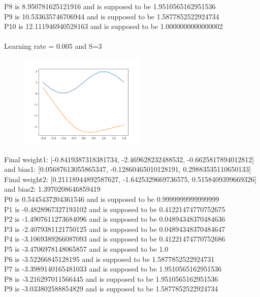 \documentclass{article}
\begin{document}
P8 is 8.950781625121916 and is supposed to be 1.9510565162951536\\
P9 is 10.533635746706944 and is supposed to be 1.5877852522924734\\
P10 is 12.111946940528163 and is supposed to be 1.0000000000000002\\~\\
Learning rate = 0.005 and S=3\\
\begin{figure}[htp]
    \centering
    \includegraphics[width=6cm]{photos/1_005.png}
    \label{fig:2}
\end{figure}
Final weight1: [-0.8419387318381734, -2.469628232488532, -0.6625817894012812]\\ and bias1: [0.05687613055865347, -0.12860465010128191, 0.29883535110650133]\\
Final weight2: [0.21118944892587627, -1.6425329669736575, 0.5158409399669326]\\ and bias2: 1.3970208646859419\\
P0 is 0.5445437204361546 and is supposed to be 0.9999999999999999\\
P1 is -0.4828967327193102 and is supposed to be 0.41221474770752675\\
P2 is -1.4907611273684096 and is supposed to be 0.04894348370484636\\
P3 is -2.4079381121750125 and is supposed to be 0.04894348370484647\\
P4 is -3.1069389266087093 and is supposed to be 0.41221474770752686\\
P5 is -3.4706978148065857 and is supposed to be 1.0\\
P6 is -3.52266845128195 and is supposed to be 1.5877852522924731\\
P7 is -3.3989140165481033 and is supposed to be 1.9510565162951536\\
P8 is -3.216297011566445 and is supposed to be 1.9510565162951536\\
P9 is -3.033802588854829 and is supposed to be 1.5877852522924734\\
\end{document}
